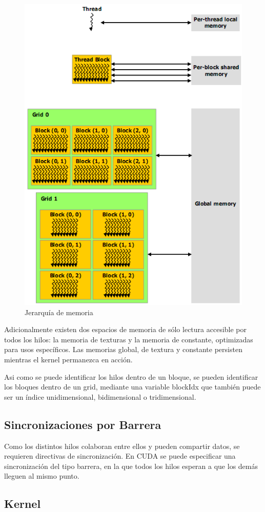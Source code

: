 \documentclass[twoside]{article}
\begin{document}
\begin{figure}
   \begin{center}
      \includegraphics[width=.5\textwidth]{MemoriaHierarchy.png}
      \caption{\label{fig:MemoriaHierarchy} Jerarquía de memoria}
   \end{center}
\end{figure}

Adicionalmente existen dos espacios de memoria de sólo lectura accesible por todos los hilos: la memoria de texturas y la memoria de constante, optimizadas para usos específicos. Las memorias global, de textura y constante persisten mientras el kernel permanezca en acción.

Asi como se puede identificar los hilos dentro de un bloque, se pueden identificar los bloques dentro de un grid, mediante una variable blockIdx que también puede ser un índice unidimensional, bidimensional o tridimensional.

\subsection{Sincronizaciones por Barrera}

Como los distintos hilos colaboran entre ellos y pueden compartir datos, se requieren directivas de sincronización. En CUDA se puede especificar una sincronización del tipo barrera, en la que todos los hilos esperan a que los demás lleguen al mismo punto.

\subsection{Kernel}
\end{document}
